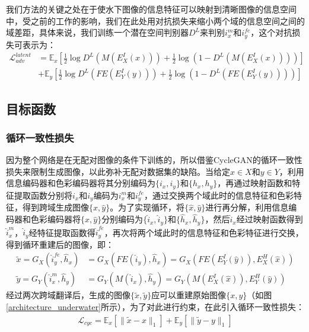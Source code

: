 我们方法的关键之处在于使水下图像的信息特征可以映射到清晰图像的信息空间中，受之前的工作\cite{lee2018diverse}\cite{wan2020bringing}的影响，我们在此处用对抗损失来缩小两个域的信息空间之间的域差距，具体来说，我们训练一个潜在空间判别器$D^{L}$来判别$i_x^m$和$i_y^{fe}$，这个对抗损失可表示为：
\begin{equation}
\begin{split}
\mathcal{L}_{adv}^{latent} & = \mathbb{E}_x[\frac{1}{2}\log D^{L}(M(E_X^I(x))) + \frac{1}{2}\log(1-D^L(M(E_X^I(x))))] \\
& + \mathbb{E}_y[\frac{1}{2}\log D^{L}(FE(E_Y^I(y))) + \frac{1}{2}\log(1-D^L(FE(E_Y^I(y))))]
\end{split}
\label{eq:latent_GAN}
\end{equation}

\subsection{目标函数}

\subsubsection{循环一致性损失}

因为整个网络是在无配对图像的条件下训练的，所以借鉴CycleGAN\cite{zhu2017unpaired}的循环一致性损失来限制生成图像，以此弥补无配对数据集的缺陷。当给定$x\in X$和$y\in Y$，利用信息编码器和色彩编码器将其分别编码为$\{i_x, i_y\}$和$\{h_x, h_y\}$，再通过映射函数和特征提取函数分别将$i_x$和$i_y$编码为$i_x^m$和$i_y^{fe}$，通过交换两个域此时的信息特征和色彩特征，得到跨域生成图像$\{\hat{x}, \hat{y}\}$。为了实现循环，将$\{\hat{x}, \hat{y}\}$进行再分解，利用信息编码器和色彩编码器将$\{\hat{x}, \hat{y}\}$分别编码为$\{\hat{i}_x, \hat{i}_y\}$和$\{\hat{h}_x, \hat{h}_y\}$，然后$\hat{i}_x$经过映射函数得到$\hat{i}_x^m$，$\hat{i}_y$经特征提取函数得$\hat{i}_y^{fe}$，再次将两个域此时的信息特征和色彩特征进行交换，得到循环重建后的图像，即：
\begin{equation}
\begin{split}
\tilde{x}=G_X(\hat{i}_y^{fe}, \hat{h}_x) & =G_X(FE(\hat{i}_y), \hat{h}_x)=G_X(FE(E_Y^I(\hat{y})), E_X^H(\hat{x})) \\
\tilde{y}=G_Y(\hat{i}_x^{m}, \hat{h}_y) & =G_Y(M(\hat{i}_x), \hat{h}_y)=G_Y(M(E_X^I(\hat{x})), E_Y^H(\hat{y}))
\end{split}
\label{eq:cycle}
\end{equation}
经过两次跨域翻译后，生成的图像$\{\tilde{x}, \tilde{y}\}$应可以重建原始图像$\{x, y\}$（如图\ref{architecture_underwater}所示），为了对此进行约束，在此引入循环一致性损失：
\begin{equation}
\begin{split}
\mathcal{L}_{cyc}=\mathbb{E}_x[\parallel\tilde{x}-x\parallel_1] + \mathbb{E}_y[\parallel\tilde{y}-y\parallel_1]
\end{split}
\label{eq:cycle_consistenty}
\end{equation}

